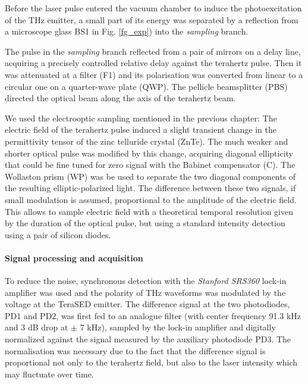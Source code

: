 Before the laser pulse entered the vacuum chamber to induce the photoexcitation of the THz emitter, a small part of its energy was separated by a reflection from a microscope glass BS1 in Fig. \ref{fg_exp}) into the \textit{sampling} branch. 

The pulse in the \textit{sampling} branch reflected from a pair of mirrors on a delay line, acquiring a precisely controlled relative delay against the terahertz pulse. Then it was attenuated at a filter (F1) and its polarisation was converted from linear to a circular one on a quarter-wave plate (QWP). The pellicle beamsplitter (PBS) directed the optical beam along the axis of the terahertz beam. 

We used the electrooptic sampling mentioned in the previous chapter: The electric field of the terahertz pulse induced a slight transient change in the permittivity tensor of the zinc telluride crystal (ZnTe). The much weaker and shorter optical pulse was modified by this change, acquiring diagonal ellipticity that could be fine tuned for zero signal with the Babinet compensator (C). The Wollaston prism (WP) was be used to separate the two diagonal components of the resulting elliptic-polarized light. The difference between these two signals, if small modulation is assumed, proportional to the amplitude of the electric field. This allows to sample electric field with a theoretical temporal resolution given by the duration of the optical pulse, but using a standard intensity detection using a pair of silicon diodes.   

\paragraph{Signal processing and acquisition}%
To reduce the noise, synchronous detection with the \textit{Stanford SRS360} lock-in amplifier was used and the polarity of THz waveforms was modulated by the voltage at the TeraSED emitter. The difference signal at the two photodiodes, PD1 and PD2, was first fed to an analogue filter (with center frequency 91.3 kHz and 3 dB drop at $\pm$ 7 kHz), sampled by the lock-in amplifier and digitally normalized against the signal measured by the auxiliary photodiode PD3. The normalisation was necessary due to the fact that the difference signal is proportional not only to the terahertz field, but also to the laser intensity which may fluctuate over time. 

